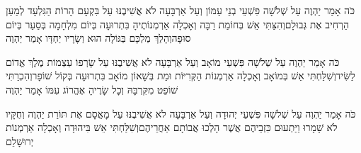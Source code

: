 \documentclass[../main/main.tex]{subfiles}
\begin{document}
\begin{multicols*}{\ncols}
כֹּה אָמַר יַהְוֶה עַל שְׁלֹשָׁה פִּשְׁעֵי בְנֵי עַמּוֹן וְעַל אַרְבָּעָה לֹא אֲשִׁיבֶנּוּ עַל בִּקְעָם הָרוֹת הַגִּלְעָד לְמַעַן הַרְחִיב אֶת גְּבוּלָם\PreVerseSpace{}וְהִצַּתִּי אֵשׁ בְּחוֹמַת רַבָּה וְאָכְלָה אַרְמְנוֹתֶיהָ בִּתְרוּעָה בְּיוֹם מִלְחָמָה בְּסַעַר בְּיוֹם סוּפָה\PreVerseSpace{}וְהָלַךְ מַלְכָּם בַּגּוֹלָה הוּא וְשָׂרָיו יַחְדָּו אָמַר יַהְוֶה\OpenSection{}\par
{}כֹּה אָמַר יַהְוֶה עַל שְׁלֹשָׁה פִּשְׁעֵי מוֹאָב וְעַל אַרְבָּעָה לֹא אֲשִׁיבֶנּוּ עַל שָׂרְפוֹ עַצְמוֹת מֶלֶךְ אֱדוֹם לַשִּׂיד\PreVerseSpace{}וְשִׁלַּחְתִּי אֵשׁ בְּמוֹאָב וְאָכְלָה אַרְמְנוֹת הַקְּרִיּוֹת וּמֵת בְּשָׁאוֹן מוֹאָב בִּתְרוּעָה בְּקוֹל שׁוֹפָר\PreVerseSpace{}וְהִכְרַתִּי שׁוֹפֵט מִקִּרְבָּהּ וְכָל שָׂרֶיהָ אֶהֱרוֹג עִמּוֹ אָמַר יַהְוֶה\OpenSection{}\par
{}כֹּה אָמַר יַהְוֶה עַל שְׁלֹשָׁה פִּשְׁעֵי יְהוּדָה וְעַל אַרְבָּעָה לֹא אֲשִׁיבֶנּוּ עַל מָאֳסָם אֶת תּוֹרַת יַהְוֶה וְחֻקָּיו לֹא שָׁמָרוּ וַיַּתְעוּם כִּזְבֵיהֶם אֲשֶׁר הָלְכוּ אֲבוֹתָם אַחֲרֵיהֶם\PreVerseSpace{}וְשִׁלַּחְתִּי אֵשׁ בִּיהוּדָה וְאָכְלָה אַרְמְנוֹת יְרוּשָׁלֵם\OpenSection{}\par

\end{multicols*}
\end{document}
